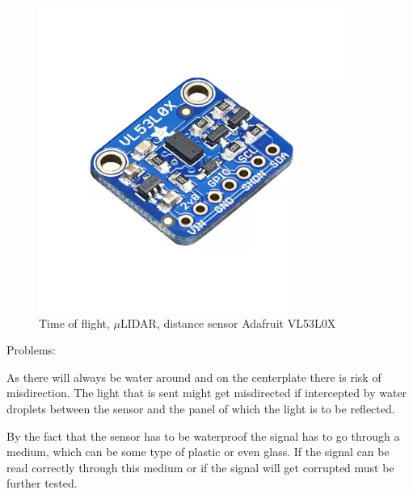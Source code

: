 \begin{figure}[H]
	\centering %
	\includegraphics[width = 10cm]{Figures/Adafruit_height_sensor.png}
	\caption{Time of flight, $\mu$LIDAR, distance sensor Adafruit VL53L0X}
	\label{micro_lidar}
\end{figure}
Problems: %

As there will always be water around and on the centerplate there is risk of misdirection. The light that is sent might get misdirected if intercepted by water droplets between the sensor and the panel of which the light is to be reflected. %

By the fact that the sensor has to be waterproof the signal has to go through a medium, which can be some type of plastic or even glass.  
If the signal can be read correctly through this medium or if the signal will get corrupted must be further tested. %



